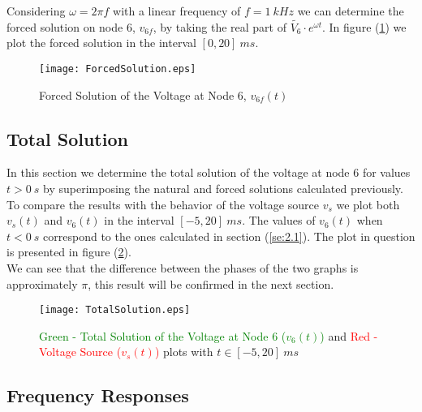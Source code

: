 Considering $\omega = 2 \pi f$ with a linear frequency of $f = 1 \:kHz$ we can determine the forced solution on node 6, $v_{6f}$,
by taking the real part of $\widetilde{V_6} \cdot e^{\omega t}$. In figure (\ref{fig:ForcedSolution}) we plot the forced solution in the interval $[0, 20] \: ms$.

\begin{figure}[H] \centering
\texttt{[image: ForcedSolution.eps]}
\caption{Forced Solution of the Voltage at Node 6, $v_{6f}(t)$}
\label{fig:ForcedSolution}
\end{figure}

\subsection{Total Solution}

In this section we determine the total solution of the voltage at node 6 for values $t > 0 \:s$
by superimposing the natural and forced solutions calculated previously. 
To compare the results with the behavior of the voltage source $v_s$ 
we plot both $v_s(t)$ and $v_6(t)$ in the interval $[-5, 20] \:ms$.
The values of $v_6(t)$ when $t < 0 \: s$ correspond to the ones calculated in section (\ref{se:2.1}). 
The plot in question is presented in figure (\ref{fig:TotalSolution}).
\\
We can see that the difference between the phases of the two graphs is approximately $\pi$, this result will be confirmed in the next section.

\begin{figure}[H] \centering
\texttt{[image: TotalSolution.eps]}
\caption{\textcolor{green}{Green - Total Solution of the Voltage at Node 6 ($v_6(t)$)} and \textcolor{red}{Red - Voltage Source ($v_s(t)$)} plots with $t \in [-5, 20] \: ms$}
\label{fig:TotalSolution}
\end{figure}



\subsection{Frequency Responses}
\label{sec:AnalFRes}

